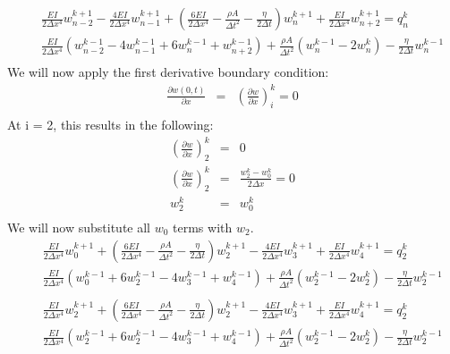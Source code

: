 \documentclass[a4paper]{article}
\begin{document}
\begin{eqnarray*}
& & \frac{EI}{2\Delta x^{4}}w^{k+1}_{n-2} - \frac{4EI}{2\Delta x^{4}}w^{k+1}_{n-1} + (\frac{6EI}{2\Delta x^{4}} - \frac{\rho A}{\Delta t^{2}} - \frac{\eta}{2\Delta t})w^{k+1}_{n}+\frac{EI}{2\Delta x^{4}}w^{k+1}_{n+2} = q^{k}_{n}\\
& & \frac{EI}{2\Delta x^{4}}(w^{k-1}_{n-2} - 4 w^{k-1}_{n-1} + 6 w^{k-1}_{n} +  w^{k-1}_{n+2}) + \frac{\rho A}{\Delta t^{2}}(w^{k-1}_{n}-2w^{k}_{n}) - \frac{\eta}{2\Delta t}w^{k-1}_{n} \\
\end{eqnarray*}
We will now apply the first derivative boundary condition:
\begin{eqnarray*}
\frac{\partial w(0,t)}{\partial x} & = & (\frac{\partial w}{\partial x})^{k}_{i} = 0\\
\end{eqnarray*}
At i = 2, this results in the following:
\begin{eqnarray*}
(\frac{\partial w}{\partial x})^{k}_{2} & = & 0\\
(\frac{\partial w}{\partial x})^{k}_{2} & = & \frac{w^{k}_{2}-w^{k}_{0}}{2\Delta x} = 0\\
w^{k}_{2} & = & w^{k}_{0}\\
\end{eqnarray*}
We will now substitute all $w_{0}$ terms with $w_{2}$.
\begin{eqnarray*}
& & \frac{EI}{2\Delta x^{4}}w^{k+1}_{0} + (\frac{6EI}{2\Delta x^{4}} - \frac{\rho A}{\Delta t^{2}} - \frac{\eta}{2\Delta t})w^{k+1}_{2}-\frac{4EI}{2\Delta x^{4}}w^{k+1}_{3}+\frac{EI}{2\Delta x^{4}}w^{k+1}_{4} = q^{k}_{2}\\
& & \frac{EI}{2\Delta x^{4}}(w^{k-1}_{0} + 6 w^{k-1}_{2} - 4 w^{k-1}_{3} +  w^{k-1}_{4}) + \frac{\rho A}{\Delta t^{2}}(w^{k-1}_{2}-2w^{k}_{2}) - \frac{\eta}{2\Delta t}w^{k-1}_{2} \\
\end{eqnarray*}
\begin{eqnarray*}
& & \frac{EI}{2\Delta x^{4}}w^{k+1}_{2} + (\frac{6EI}{2\Delta x^{4}} - \frac{\rho A}{\Delta t^{2}} - \frac{\eta}{2\Delta t})w^{k+1}_{2}-\frac{4EI}{2\Delta x^{4}}w^{k+1}_{3}+\frac{EI}{2\Delta x^{4}}w^{k+1}_{4} = q^{k}_{2}\\
& & \frac{EI}{2\Delta x^{4}}(w^{k-1}_{2} + 6 w^{k-1}_{2} - 4 w^{k-1}_{3} +  w^{k-1}_{4}) + \frac{\rho A}{\Delta t^{2}}(w^{k-1}_{2}-2w^{k}_{2}) - \frac{\eta}{2\Delta t}w^{k-1}_{2} \\
\end{eqnarray*}
\end{document}
